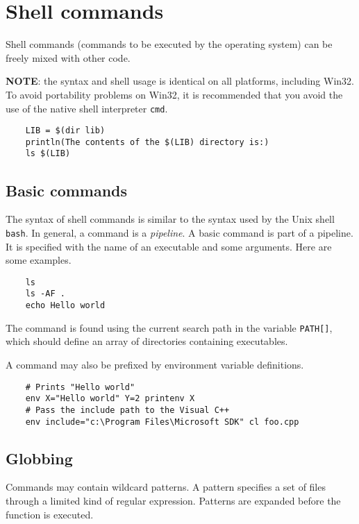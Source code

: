 %
\hypertarget{shell}{}
\section{Shell commands}

Shell commands (commands to be executed by the operating system) can be freely mixed with other
code.

\textbf{NOTE}: the syntax and shell usage is identical on all platforms, including Win32.  To avoid
portability problems on Win32, it is recommended that you avoid the use of the native shell
interpreter \verb+cmd+.

\begin{verbatim}
    LIB = $(dir lib)
    println(The contents of the $(LIB) directory is:)
    ls $(LIB)
\end{verbatim}

\subsection{Basic commands}

The syntax of shell commands is similar to the syntax used by the Unix shell \verb+bash+.  In
general, a command is a \emph{pipeline}.  A basic command is part of a pipeline.  It is specified
with the name of an executable and some arguments.  Here are some examples.

\begin{verbatim}
    ls
    ls -AF .
    echo Hello world
\end{verbatim}

The command is found using the current search path in the variable \verb+PATH[]+, which should
define an array of directories containing executables.

A command may also be prefixed by environment variable definitions.

\begin{verbatim}
    # Prints "Hello world"
    env X="Hello world" Y=2 printenv X
    # Pass the include path to the Visual C++
    env include="c:\Program Files\Microsoft SDK" cl foo.cpp
\end{verbatim}

\subsection{Globbing}

Commands may contain wildcard patterns.  A pattern specifies a set of files through a limited kind
of regular expression.  Patterns are expanded before the function is executed.


